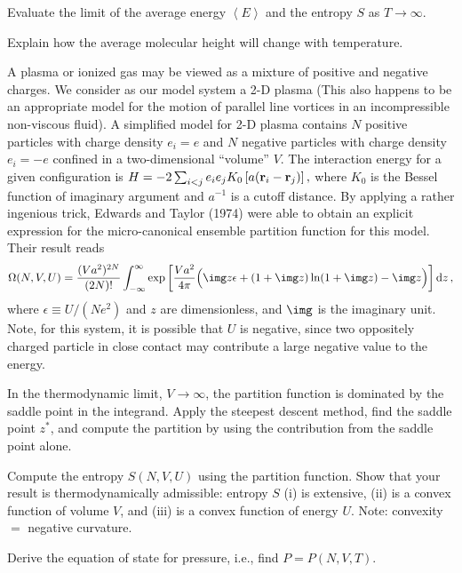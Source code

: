 \smallskip\subp
Evaluate the limit of the average energy $\left< E \right>$
and the entropy $S$ as $T \rightarrow \infty$.

\smallskip\subp
Explain how the average molecular height will change with temperature.

\bigskip\bigskip
{}
A plasma or ionized gas may be viewed as a mixture of positive and negative charges.
We consider as our model system a 2-D plasma
(This also happens to be an appropriate model for the motion of
parallel line vortices in an incompressible non-viscous fluid).
A simplified model for 2-D plasma contains
$N$ positive particles with charge density $e_i=e$
and $N$ negative particles with charge density $e_i = -e$ confined in a
two-dimensional ``volume'' $V$. The interaction energy for a given configuration is
$ H = -2\sum_{i<j} e_i e_j K_0\left[a ({\bf r}_i - {\bf r}_j)\right] ,$
where $K_0$ is the Bessel function of imaginary argument
and $a^{-1}$ is a cutoff distance.
By applying a rather ingenious trick, Edwards and Taylor (1974) were able to
obtain an explicit expression for the micro-canonical ensemble
partition function for this model.
Their result reads
$$ \Omega(N, V, U) = \frac{(Va^2)^{2N}}{(2N)!} \int_{-\infty}^{\infty} 
\exp\left[\frac{Va^2}{4\pi} \Big(\img z\epsilon + (1+\img z)\ln(1 + \img z) - \img z\Big) \right] {\rm d}z\,,$$
where $\epsilon \equiv U/(Ne^2)$ and $z$ are dimensionless,
and $\img$ is the imaginary unit.
Note, for this system, it is possible that $U$ is negative,
since two oppositely charged particle in close contact may contribute
a large negative value to the energy.

\smallskip\subp
In the thermodynamic limit, $V \to \infty$,
the partition function is dominated by the saddle point in the integrand.
Apply the steepest descent method, find the saddle point $z^*$,
and compute the partition by using the contribution from the saddle point alone.

\smallskip\subp
Compute the entropy $S(N,V,U)$ using the partition function.
Show that your result is thermodynamically admissible:
entropy $S$ (i) is extensive,
(ii) is a convex function of volume $V$,
and (iii) is a convex function of energy $U$.
Note: convexity $=$ negative curvature.

\smallskip\subp
Derive the equation of state for pressure, i.e., find $P=P(N,V,T)$.

